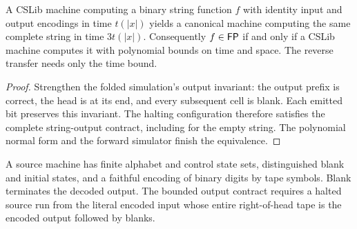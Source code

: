 \begin{theorem}
  \label{thm:polytime-cslib-FP-eq}
  \leanok
  A CSLib machine computing a binary string function $f$ with identity input
  and output encodings in time $t(|x|)$ yields a canonical machine computing
  the same complete string in time $3t(|x|)$. Consequently $f\in\mathsf{FP}$ if
  and only if a CSLib machine computes it with polynomial bounds on time
  and space. The reverse transfer needs only the time bound.
\end{theorem}
\begin{proof}
  \leanok
  Strengthen the folded simulation's output invariant: the output prefix is
  correct, the head is at its end, and every subsequent cell is blank.
  Each emitted bit preserves this invariant. The halting configuration
  therefore satisfies the complete string-output contract, including for
  the empty string. The polynomial normal form and the forward simulator
  finish the equivalence.
\end{proof}

\begin{definition}
  \label{def:mathlib-tm0-binary-io}
  \leanok
  A source machine has finite alphabet and control state sets, distinguished
  blank and initial states, and a faithful encoding of binary digits by tape
  symbols. Blank terminates the decoded output. The bounded output contract
  requires a halted source run from the literal encoded input whose entire
  right-of-head tape is the encoded output followed by blanks.
\end{definition}

